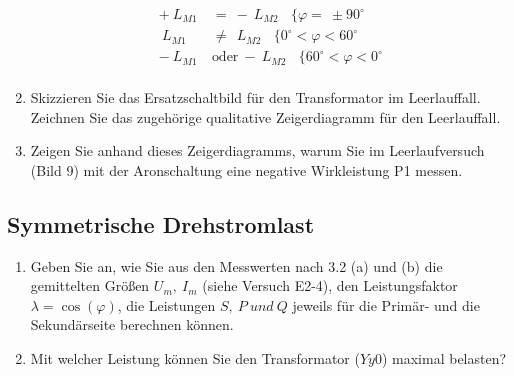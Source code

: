 \begin{enumerate}[label=\alph*)]
\begin{align*}
          +\ L_{M1}   & =\ -\ L_{M2}\ \ \ \ \{ \varphi =\ \pm90^\circ                \\
          \ L_{M1}    & \neq\ \ L_{M2}\ \ \ \ \{ 0^\circ< \varphi < 60^\circ         \\
          -\ L_{M1}\  & \text{oder}\ -\ L_{M2}\ \ \ \ \{ 60^\circ< \varphi < 0^\circ \\
        \end{align*}
  \item Skizzieren Sie das Ersatzschaltbild für den Transformator im Leerlauffall.
        Zeichnen Sie das zugehörige qualitative Zeigerdiagramm für den Leerlauffall.
  \item Zeigen Sie anhand dieses Zeigerdiagramms, warum Sie im Leerlaufversuch (Bild 9)
        mit der Aronschaltung eine negative Wirkleistung P1 messen.
\end{enumerate}
\subsection{Symmetrische Drehstromlast }
\begin{enumerate}[label=\alph*)]
  \item Geben Sie an, wie Sie aus den Messwerten nach 3.2 (a) und (b) die gemittelten
        Größen $U_m,\ I_m$ (siehe Versuch E2-4), den Leistungsfaktor
        $\lambda=\cos(\varphi)$, die Leistungen $S,\ P\ und\ Q$ jeweils für die Primär-
        und die Sekundärseite berechnen können.
  \item Mit welcher Leistung können Sie den Transformator ($Yy0$) maximal belasten?
\end{enumerate}
